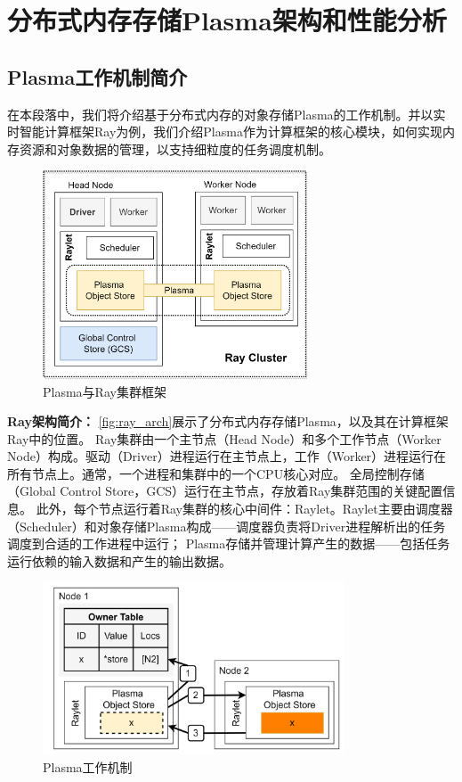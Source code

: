 \chapter{分布式内存存储Plasma架构和性能分析}

\section{Plasma工作机制简介}

在本段落中，我们将介绍基于分布式内存的对象存储Plasma的工作机制。并以实时智能计算框架Ray为例，我们介绍Plasma作为计算框架的核心模块，如何实现内存资源和对象数据的管理，以支持细粒度的任务调度机制。

\begin{figure}[h] 
    \centering
    \includegraphics[width=0.7\textwidth]{image/chap02/ray_arch.png}
    \caption{Plasma与Ray集群框架}
    \label{fig:ray_arch}
\end{figure}

\textbf{Ray架构简介：}
\autoref{fig:ray_arch}展示了分布式内存存储Plasma，以及其在计算框架Ray中的位置。
Ray集群由一个主节点（Head Node）和多个工作节点（Worker Node）构成。驱动（Driver）进程运行在主节点上，工作（Worker）进程运行在所有节点上。通常，一个进程和集群中的一个CPU核心对应。
全局控制存储（Global Control Store，GCS）运行在主节点，存放着Ray集群范围的关键配置信息。
此外，每个节点运行着Ray集群的核心中间件：Raylet。Raylet主要由调度器（Scheduler）和对象存储Plasma构成——调度器负责将Driver进程解析出的任务调度到合适的工作进程中运行；
Plasma存储并管理计算产生的数据——包括任务运行依赖的输入数据和产生的输出数据。

\begin{figure}[h] 
    \centering
    \includegraphics[width=0.8\textwidth]{image/chap02/object_fetch.png}
    \caption{Plasma工作机制}
    \label{fig:object_fetch}
\end{figure}

